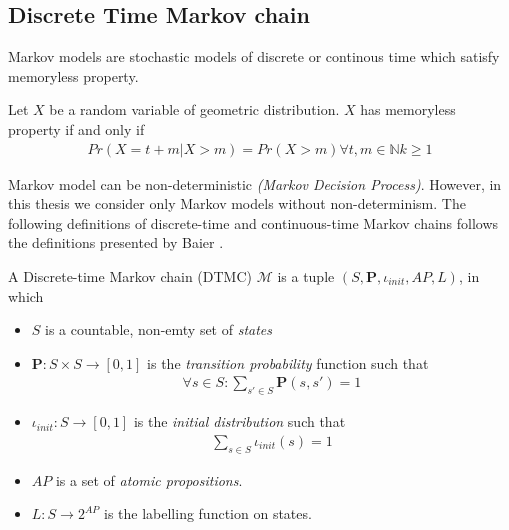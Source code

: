 \subsection{Discrete Time Markov chain}
Markov models are stochastic models of discrete or continous time which satisfy memoryless property.
\begin{definition}
    Let $X$ be a random variable of geometric distribution. $X$ has memoryless property if and only if
    \begin{align*}
        Pr(X = t + m | X > m) = Pr(X > m) \forall t,m \in \mathbb{N} k \geq 1
    \end{align*}
\end{definition}
Markov model can be non-deterministic \textit{(Markov Decision Process)}. However, in this thesis we
consider only Markov models without non-determinism. The following definitions of discrete-time and
continuous-time Markov chains follows the definitions presented by Baier \cite{baier2008principles}.
\begin{definition}
    A Discrete-time Markov chain (DTMC) $\mathcal{M}$ is a tuple $(S,\mathbf{P}, \iota_{init}, AP, L)$,
    in which
    \begin{itemize}
        \item $S$ is a countable, non-emty set of \textit{states}
        \item $\mathbf{P}:S\times S \rightarrow [0,1]$ is the \textit{transition probability}
              function such that
              \begin{align*}
                  \forall s \in S : \sum_{s'\in S}\mathbf{P}(s, s') = 1
              \end{align*}
        \item $\iota_{init}: S \rightarrow [0,1]$ is the \textit{initial distribution} such that
              \begin{align*}
                  \sum_{s\in S} \iota_{init}(s) = 1
              \end{align*}
        \item $AP$ is a set of \textit{atomic propositions}.
        \item $L: S \rightarrow 2^{AP}$ is the labelling function on states.
    \end{itemize}
\end{definition}

